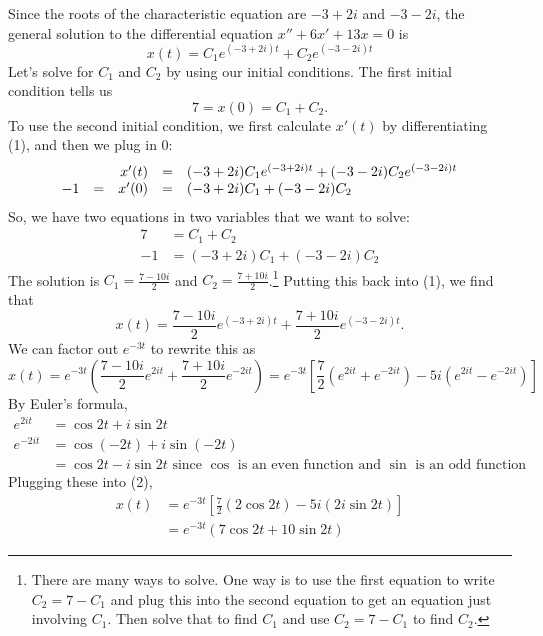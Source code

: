 \documentclass[main]{subfiles}
\begin{document}
\begin{enumerate}[resume]
\begin{solution}
\begin{itemize}
    Since the roots of the characteristic equation are $-3 + 2i$ and $-3
    - 2i$, the general solution to the differential equation $x'' + 6x'
    + 13x = 0$ is
    \begin{equation}
    x(t) = C_1 e^{(-3 + 2i) t} + C_2 e^{(-3 - 2i) t}
    \end{equation}
    Let's solve for $C_1$ and $C_2$ by using our initial conditions.
    The first initial condition tells us
    \[ 7 = x(0) = C_1 + C_2.\] To use the second initial condition, we
    first calculate $x'(t)$ by differentiating
    (1), and then we plug in 0:
    \[ \begin{array}{r c r c l}
    & & x'(t) & = & (-3 + 2i) C_1 e^{(-3 + 2i) t} + (-3 - 2i) C_2
    e^{(-3 - 
    2i) t} \\
    -1 & = & x'(0) & = & (-3 + 2i) C_1 + (-3 - 2i) C_2
    \end{array}\]
    So, we have two equations in two variables that we want to solve:
    \begin{align*}
    7 & = C_1 + C_2 \\
    -1 & = (-3 + 2i) C_1 + (-3 - 2i) C_2
    \end{align*}
    The solution is $C_1 = \frac{7 - 10i}{2}$ and $C_2 = \frac{7 +
    10i}{2}$.\footnote{There are many ways to solve.  One way is to
    use the first equation to write $C_2 = 7 - C_1$ and plug this into
    the second equation to get an equation just involving $C_1$.  Then
    solve that to find $C_1$ and use $C_2 = 7 - C_1$ to find $C_2$.}
    Putting this back into (1), we find that
    \[ x(t) = \frac{7 - 10i}{2} e^{(-3 + 2i) t} + \frac{7 + 10i}{2}
    e^{(-3 - 2i) t}.\] We can factor out $e^{-3t}$ to rewrite this as
    \begin{equation}
    x(t) = e^{-3t}
    \left( \frac{7 - 10i}{2} e^{2it} + \frac{7 + 10i}{2} e^{-2it}
    \right) = e^{-3t} \left[ \frac{7}{2} \left(e^{2it} + e^{-2it}
    \right) - 5i \left( e^{2it} - e^{-2it} \right)
    \right]
    \end{equation}
    By Euler's formula,
    \begin{align*}
    e^{2it} & = \cos 2t + i \sin 2t \\
    e^{-2it} & = \cos (-2t) + i \sin (-2t) \\
    & = \cos 2t - i \sin 2t \textrm{ since $\cos$ is an even function
    and $\sin$ is an odd function}
    \end{align*}
    Plugging these into (2),
    \begin{align*}
    x(t) & = e^{-3t} \left[ \frac{7}{2} (2 \cos 2t) - 5i (2i
    \sin 2t) \right] \\
    & = \boxed{e^{-3t} \left( 7 \cos 2t + 10 \sin 2t \right)}
    \end{align*}


\end{itemize}
\end{solution}
\end{enumerate}
\end{document}
